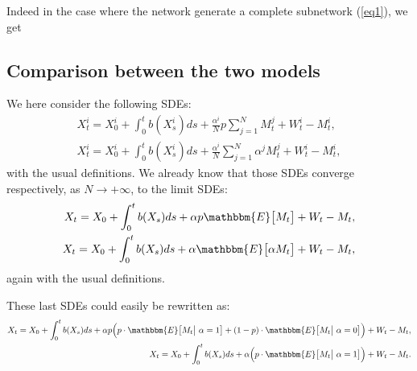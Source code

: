  
Indeed in the case where the network generate a complete subnetwork (\ref{eq1}), we get


\subsection{Comparison between the two models}
We here consider the following SDEs:
\begin{align*}
  X^i_t = X^i_0 + \int_0^t b(X^i_s) ds + \frac{\alpha^i}{N} p \sum_{j = 1}^N M^j_t + W^i_t - M^i_t, \\
  X^i_t = X^i_0 + \int_0^t b(X^i_s) ds + \frac{\alpha^i}{N} \sum_{j = 1}^N \alpha^j M^j_t + W^i_t - M^i_t,
\end{align*}
with the usual definitions. We already know that those SDEs converge respectively, as $N \to +\infty$, to the limit SDEs:
\begin{align*}
  X_t = X_0 + \int_0^t b(X_s) ds + \alpha p \mathbbm{E} \big[ M_t \big] + W_t - M_t, \\
  X_t = X_0 + \int_0^t b(X_s) ds + \alpha \mathbbm{E} \big[ \alpha M_t \big] + W_t - M_t,
\end{align*}
again with the usual definitions.

These last SDEs could easily be rewritten as:
\begin{align*}
  X_t = X_0 + \int_0^t b(X_s) ds + \alpha p \Big( p \cdot \mathbbm{E} \big[ M_t \big| \  \alpha = 1 \big. \big] + (1-p) \cdot \mathbbm{E} \big[ M_t \big| \  \alpha = 0 \big. \big] \Big) + W_t - M_t, \\
  X_t = X_0 + \int_0^t b(X_s) ds + \alpha \Big( p \cdot \mathbbm{E} \big[ M_t \big| \  \alpha = 1 \big. \big] \Big) + W_t - M_t.
\end{align*}

